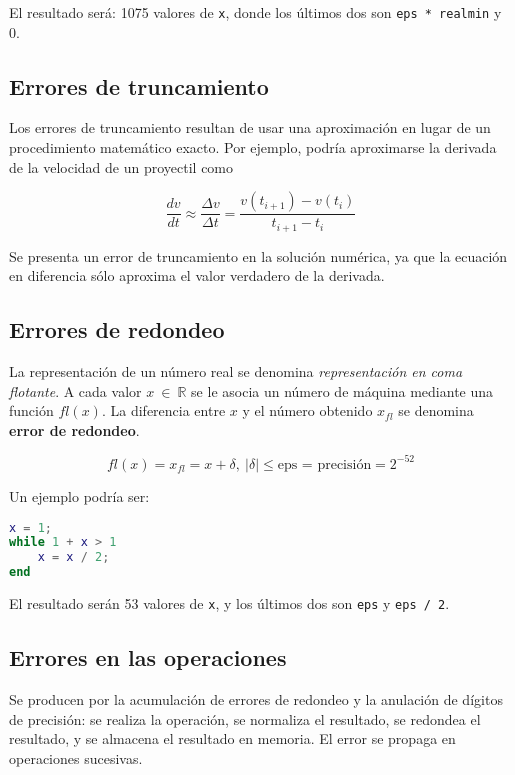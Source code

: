 \documentclass{article}
\begin{document}
El resultado será: 1075 valores de \verb|x|, donde los últimos dos son 
\verb|eps * realmin| y 0.

\subsection{Errores de truncamiento}

Los errores de truncamiento resultan de usar una aproximación en lugar de un
procedimiento matemático exacto. Por ejemplo, podría aproximarse la derivada de
la velocidad de un proyectil como 

\begin{equation}
    \frac{dv}{dt} \approx \frac{\Delta v}{\Delta t} = \frac{v(t_{i+1}) - v(t_i)}{t_{i+1} - t_i}
\end{equation}

Se presenta un error de truncamiento en la solución numérica, ya que la ecuación
en diferencia sólo aproxima el valor verdadero de la derivada.

\subsection{Errores de redondeo}

La representación de un número real se denomina \textit{representación en coma 
flotante}. A cada valor $x\ \in\ \mathbb{R}$ se le asocia un número de máquina 
mediante una función $fl(x)$. La diferencia entre $x$ y el número obtenido 
$x_{fl}$ se denomina \textbf{error de redondeo}.

\begin{equation*}
    fl(x) = x_{fl} = x + \delta,\ |\delta| \leq \text{eps = precisión} = 2^{-52}
\end{equation*}

Un ejemplo podría ser:

\begin{lstlisting}[language=Matlab]
x = 1;
while 1 + x > 1
    x = x / 2;
end
\end{lstlisting}

El resultado serán 53 valores de \verb|x|, y los últimos dos son \verb|eps| y 
\verb|eps / 2|.

\subsection{Errores en las operaciones}

Se producen por la acumulación de errores de redondeo y la anulación de dígitos 
de precisión: se realiza la operación, se normaliza el resultado, se redondea
el resultado, y se almacena el resultado en memoria. El error se propaga en
operaciones sucesivas.
\end{document}

